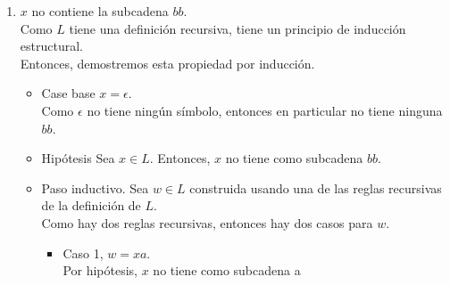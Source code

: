 \documentclass{article}
\begin{document}
\begin{enumerate}
{\begin{enumerate}
{\begin{itemize}
{\begin{itemize}
{                                    Caso 2, $w = xba$.\\
                                    Entonces, $n_a(xba) = n_a(x) + 1$ y
                                    $n_b(xba) = n_b(x) + 1$.\\ 
                                    Y por hipótesis, tenemos que 
                                    $n_a(x) \geq n_b(x)$, por lo que que 
                                    $n_a(xba) = n_a(x) + 1 \geq n_b(x) + 1 
                                    = n_b(xba)$.
                                }
                            \end{itemize}
                        }
                    \end{itemize}
                }
                \item {
                    $x$ no contiene la subcadena $bb$.\\
                    Como $L$ tiene una definición recursiva, tiene un principio 
                    de inducción estructural.\\
                    Entonces, demostremos esta propiedad por inducción.
                    \begin{itemize}
                        \item {
                            Case base $x = \epsilon$.\\
                            Como $\epsilon$ no tiene ningún símbolo, entonces en
                            particular no tiene ninguna $bb$.
                        }
                        \item {
                            Hipótesis
                            Sea $x \in L$. Entonces, $x$ no tiene como subcadena 
                            $bb$.
                        }
                        \item {
                            Paso inductivo.
                            Sea $w \in L$ construida usando una de las reglas 
                            recursivas de la definición de $L$.\\
                            Como hay dos reglas recursivas, entonces hay dos 
                            casos para $w$.
                            \begin{itemize}
                                \item {
                                    Caso 1, $w = xa$.\\
                                    Por hipótesis, $x$ no tiene como subcadena a
}
\end{itemize}}
\end{itemize}}
\end{enumerate}}
\end{enumerate}
\end{document}
